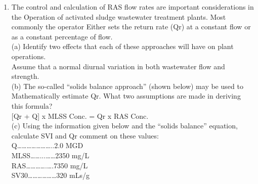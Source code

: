 \begin{enumerate}
\begin{enumerate}[label=\alph*]
\begin{enumerate}
\end{enumerate}
\end{enumerate}

\item The control and calculation of RAS flow rates are important considerations in the
Operation of activated sludge wastewater treatment plants. Most commonly the operator
Either sets the return rate (Qr) at a constant flow or as a constant percentage of flow.\\

(a) Identify two effects that each of these approaches will have on plant operations.\\
Assume that a normal diurnal variation in both wastewater flow and strength.\\

(b) The so-called “solids balance approach” (shown below) may be used to
Mathematically estimate Qr. What two assumptions are made in deriving this formula?\\

[Qr + Q] x MLSS Conc. = Qr x RAS Conc.\\

(c) Using the information given below and the “solids balance” equation, calculate SVI
and Qr comment on these values:\\

Q…………………..2.0 MGD\\
MLSS……...……2350 mg/L\\
RAS………….….7350 mg/L\\
SV30………………320 mLs/g\\

\end{enumerate}

